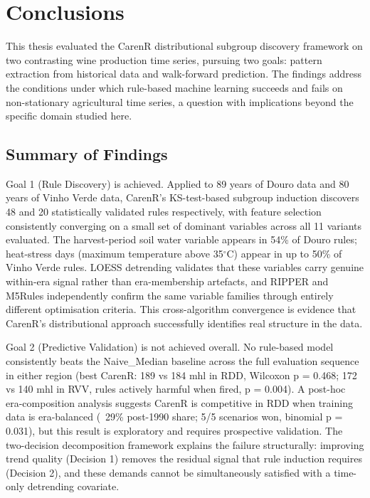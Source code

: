 
\chapter{Conclusions}\label{ch:conclusions}

This thesis evaluated the CarenR distributional subgroup discovery framework on two contrasting wine production time series, pursuing two goals: pattern extraction from historical data and walk-forward prediction. The findings address the conditions under which rule-based machine learning succeeds and fails on non-stationary agricultural time series, a question with implications beyond the specific domain studied here.


\section{Summary of Findings}\label{sec:summary_of_findings}

Goal 1 (Rule Discovery) is achieved. Applied to 89 years of Douro data and 80 years of Vinho Verde data, CarenR's KS-test-based subgroup induction discovers 48 and 20 statistically validated rules respectively, with feature selection consistently converging on a small set of dominant variables across all 11 variants evaluated. The harvest-period soil water variable appears in 54\% of Douro rules; heat-stress days (maximum temperature above 35$^\circ$C) appear in up to 50\% of Vinho Verde rules. LOESS detrending validates that these variables carry genuine within-era signal rather than era-membership artefacts, and RIPPER and M5Rules independently confirm the same variable families through entirely different optimisation criteria. This cross-algorithm convergence is evidence that CarenR's distributional approach successfully identifies real structure in the data.

Goal 2 (Predictive Validation) is not achieved overall. No rule-based model consistently beats the Naive\_Median baseline across the full evaluation sequence in either region (best CarenR: 189 vs 184 mhl in RDD, Wilcoxon p = 0.468; 172 vs 140 mhl in RVV, rules actively harmful when fired, p = 0.004). A post-hoc era-composition analysis suggests CarenR is competitive in RDD when training data is era-balanced (~29\% post-1990 share; 5/5 scenarios won, binomial p = 0.031), but this result is exploratory and requires prospective validation. The two-decision decomposition framework explains the failure structurally: improving trend quality (Decision 1) removes the residual signal that rule induction requires (Decision 2), and these demands cannot be simultaneously satisfied with a time-only detrending covariate.

